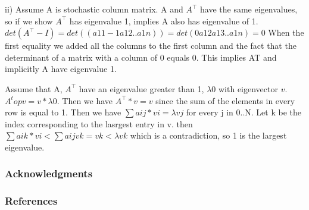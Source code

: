 \documentclass{article} %
\begin{document}
ii) Assume A is stochastic column matrix. A and $A^\top$ have the same eigenvalues, so if we show $A^\top$ has eigenvalue 1, implies A also has eigenvalue of 1.
$det(A^\top - I) = det((a11- 1  a12 .. a1n)) = det(0 a12 a13 .. a1n) = 0$
When the first equality we added all the columns to the first column and the fact that the
determinant of a matrix with a column of 0 equals 0. This implies AT and implicitly A have eigenvalue 1.

Assume that A, $A^\top$ have an eigenvalue greater than 1, $\lambda0$ with eigenvector $v$.
$A^top v = v* \lambda0$. Then we have $A^\top *v = v$ since the sum of the elements in every row is equal to 1. Then we have 
$ \sum aij*vi = \lambda vj$ for every j in 0..N. Let k be the index corresponding to the lasrgest
entry in v. then $ \sum aik*vi < \sum aij vk = vk <\lambda vk$ 
which is a contradiction, so 1 is the largest eigenvalue.


\subsubsection*{Acknowledgments}

\subsubsection*{References}
\end{document}
